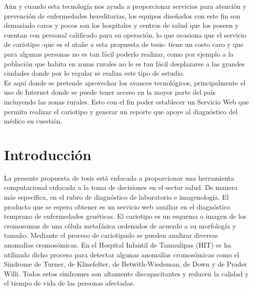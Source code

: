 \documentclass[12pt,letterpaper,titlepage]{article}
\begin{document}
Aún y cuando esta tecnología nos ayuda a proporcionar servicios para atención y prevención de enfermedades hereditarias, los equipos diseñados con este fin son demasiado caros y pocos son los hospitales y centros de salud que los poseen y cuentan con personal calificado para su operación, lo que ocasiona que el servicio de cariotipo -que es el atañe a esta propuesta de tesis- tiene un costo caro y que para algunas personas no es tan fácil poderlo realizar, como por ejemplo a la población que habita en zonas rurales no le es tan fácil desplazarse a las grandes ciudades donde por lo regular se realiza este tipo de estudio.\\
Es aquí donde se pretende aprovechar los avances tecnológicos, principalmente el uso de Internet donde se puede tener acceso en la mayor parte del país incluyendo las zonas rurales. Esto con el fin poder establecer un Servicio Web que permita realizar el cariotipo y generar un reporte que apoye al diagnóstico del médico en cuestión.\\

\section{Introducción}\label{intro}
La presente propuesta de tesis está enfocada a proporcionar una herramienta computacional enfocada a la toma de decisiones en el sector salud. De manera más específica, en el rubro de diagnóstico de laboratorio e imagenología. El producto que se espera obtener es un servicio web auxiliar en el diagnóstico temprano de enfermedades genéticas. El cariotipo es un esquema o imagen de los cromosomas de una célula metafásica ordenados de acuerdo a su morfología y tamaño. Mediante el proceso de cariotipado se pueden analizar diversas anomalías cromosómicas. En el Hospital Infantil de Tamaulipas (HIT) se ha utilizado dicho proceso para detectar algunas anomalías cromosómicas como el Síndrome de Turner, de Klinefelter, de Betwith-Wiedeman, de Down y de Prader Willi. Todos estos síndromes son altamente discapacitantes y reducen la calidad y el tiempo de vida de las personas afectadas. \\
\end{document}
